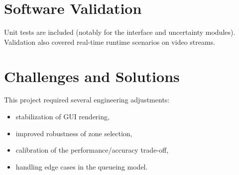 \section{Software Validation}
Unit tests are included (notably for the interface and uncertainty modules).
Validation also covered real-time runtime scenarios on video streams.

\section{Challenges and Solutions}
This project required several engineering adjustments:
\begin{itemize}
    \item stabilization of GUI rendering,
    \item improved robustness of zone selection,
    \item calibration of the performance/accuracy trade-off,
    \item handling edge cases in the queueing model.
\end{itemize}
